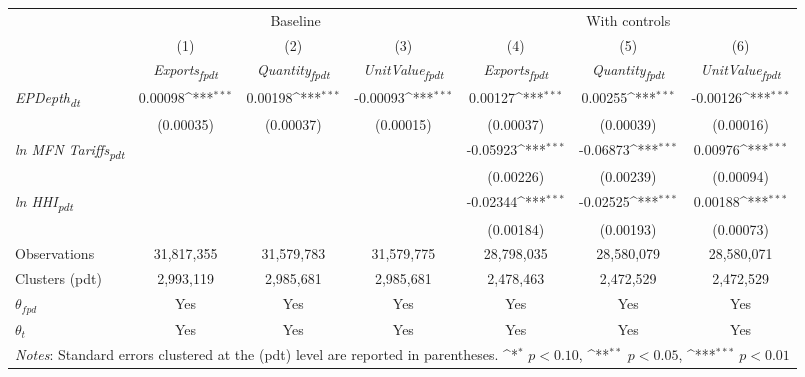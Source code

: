 {
\def\sym#1{\ifmmode^{#1}\else\(^{#1}\)\fi}
\begin{tabular}{l*{6}{c}}
\toprule
                &\multicolumn{3}{c}{Baseline}                            &\multicolumn{3}{c}{With controls}                       \\\cmidrule(lr){2-4}\cmidrule(lr){5-7}
                &\multicolumn{1}{c}{(1)}&\multicolumn{1}{c}{(2)}&\multicolumn{1}{c}{(3)}&\multicolumn{1}{c}{(4)}&\multicolumn{1}{c}{(5)}&\multicolumn{1}{c}{(6)}\\
                &\multicolumn{1}{c}{\textit{Exports\textsubscript{fpdt}}}&\multicolumn{1}{c}{\textit{Quantity\textsubscript{fpdt}}}&\multicolumn{1}{c}{\textit{UnitValue\textsubscript{fpdt}}}&\multicolumn{1}{c}{\textit{Exports\textsubscript{fpdt}}}&\multicolumn{1}{c}{\textit{Quantity\textsubscript{fpdt}}}&\multicolumn{1}{c}{\textit{UnitValue\textsubscript{fpdt}}}\\
\midrule
\textit{EPDepth\textsubscript{dt}}&  0.00098\sym{***}&  0.00198\sym{***}& -0.00093\sym{***}&  0.00127\sym{***}&  0.00255\sym{***}& -0.00126\sym{***}\\
                &(0.00035)         &(0.00037)         &(0.00015)         &(0.00037)         &(0.00039)         &(0.00016)         \\
\addlinespace
\textit{ln MFN Tariffs\textsubscript{pdt}}&                  &                  &                  & -0.05923\sym{***}& -0.06873\sym{***}&  0.00976\sym{***}\\
                &                  &                  &                  &(0.00226)         &(0.00239)         &(0.00094)         \\
\addlinespace
\textit{ln HHI\textsubscript{pdt}}&                  &                  &                  & -0.02344\sym{***}& -0.02525\sym{***}&  0.00188\sym{***}\\
                &                  &                  &                  &(0.00184)         &(0.00193)         &(0.00073)         \\
\midrule
Observations    &31,817,355         &31,579,783         &31,579,775         &28,798,035         &28,580,079         &28,580,071         \\
Clusters (pdt)  &2,993,119         &2,985,681         &2,985,681         &2,478,463         &2,472,529         &2,472,529         \\
$\theta_{fpd}$  &      Yes         &      Yes         &      Yes         &      Yes         &      Yes         &      Yes         \\
$\theta_t$      &      Yes         &      Yes         &      Yes         &      Yes         &      Yes         &      Yes         \\
\bottomrule
\multicolumn{7}{l}{\footnotesize \textit{Notes}: Standard errors clustered at the (pdt) level are reported in parentheses. \sym{*} \(p<0.10\), \sym{**} \(p<0.05\), \sym{***} \(p<0.01\)}\\
\end{tabular}
}
